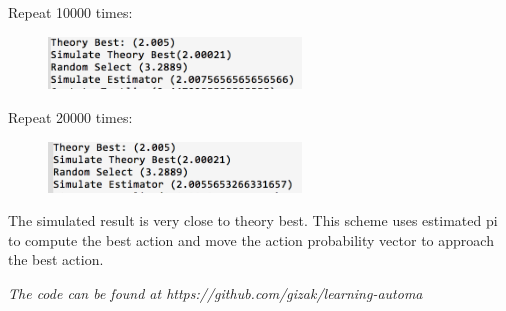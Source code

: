 \documentclass[11pt]{article}
\begin{document}
Repeat 10000 times:
\begin{figure}[H]
\includegraphics[width=0.6\textwidth]{p12.png}
\end{figure}

Repeat 20000 times:
\begin{figure}[H]
\includegraphics[width=0.6\textwidth]{p13.png}
\end{figure}

The simulated result is very close to theory best. This scheme uses estimated pi to compute the best action and move the action probability vector to approach the best action.

\emph{The code can be found at https://github.com/gizak/learning-automa}
\end{document}
